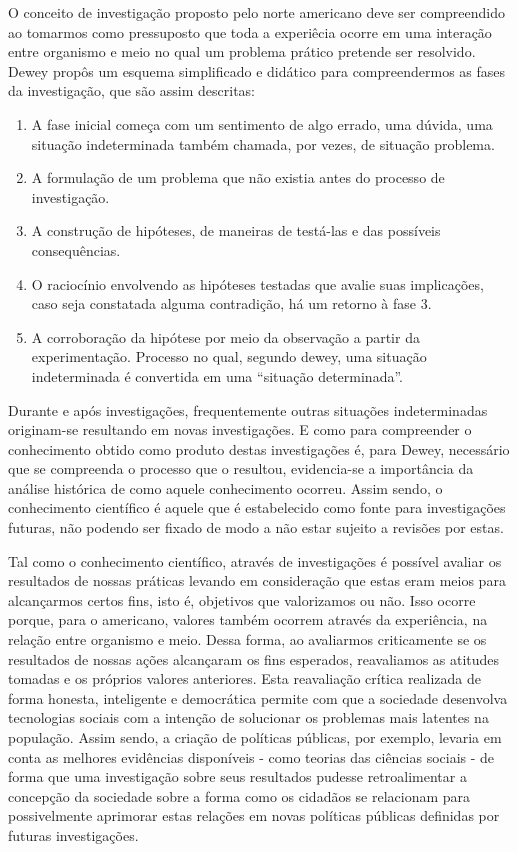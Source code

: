 \documentclass[12pt]{report}
\begin{document}
		O conceito de investigação proposto pelo norte americano deve ser compreendido ao tomarmos como pressuposto que toda a experiêcia ocorre em uma interação entre organismo e meio no qual um problema prático pretende ser resolvido. Dewey propôs um esquema simplificado e didático para compreendermos as fases da investigação, que são assim descritas:
		
	
			\begin{enumerate}
				\singlespacing
				\item A fase inicial começa com um sentimento de algo errado, uma dúvida, uma situação indeterminada também chamada, por vezes, de situação problema.
				\item A formulação de um problema que não existia antes do processo de investigação.
				\item A construção de hipóteses, de maneiras de testá-las e das possíveis consequências.
				\item O raciocínio envolvendo as hipóteses testadas que avalie suas implicações, caso seja constatada alguma contradição, há um retorno à fase 3.
				\item A corroboração da hipótese por meio da observação a partir da experimentação. Processo no qual, segundo dewey, uma situação indeterminada é convertida em uma “situação determinada”.
		\end{enumerate}
	
		\onehalfspacing 
		Durante e após investigações, frequentemente outras situações indeterminadas originam-se resultando em novas investigações. E como para compreender o conhecimento obtido como produto destas investigações é, para Dewey, necessário que se compreenda o processo que o resultou, evidencia-se a importância da análise histórica de como aquele conhecimento ocorreu. Assim sendo, o conhecimento científico é aquele que é estabelecido como fonte para investigações futuras, não podendo ser fixado de modo a não estar sujeito a revisões por estas.
		
		Tal como o conhecimento científico, através de investigações é possível avaliar os resultados de nossas práticas levando em consideração que estas eram meios para alcançarmos certos fins, isto é, objetivos que valorizamos ou não. Isso ocorre porque, para o americano, valores também ocorrem através da experiência, na relação entre organismo e meio. Dessa forma, ao avaliarmos criticamente se os resultados de nossas ações alcançaram os fins esperados, reavaliamos as atitudes tomadas e os próprios valores anteriores. Esta reavaliação crítica realizada de forma honesta, inteligente e democrática permite com que a sociedade desenvolva tecnologias sociais com a intenção de solucionar os problemas mais latentes na população. Assim sendo, a criação de políticas públicas, por exemplo, levaria em conta as melhores evidências disponíveis - como teorias das ciências sociais - de forma que uma investigação sobre seus resultados pudesse retroalimentar a concepção da sociedade sobre a forma como os cidadãos se relacionam para possivelmente aprimorar estas relações em novas políticas públicas definidas por futuras investigações.
		
\end{document}

